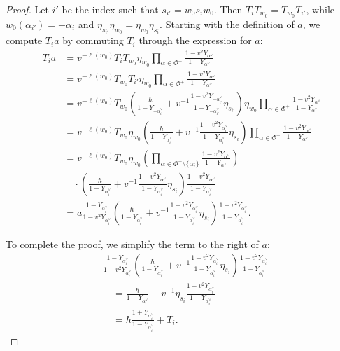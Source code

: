 \documentclass{amsart}
\theoremstyle{definition}
\numberwithin{equation}{section}
\begin{document}
\begin{proof}
    Let $i'$ be the index such that $s_{i'}=w_0s_iw_0$. Then
    $T_iT_{w_0}=T_{w_0}T_{i'}$, while
    $w_0(\alpha_{i'})=-\alpha_i$ and
    $\eta_{s_{i'}}\eta_{w_0}=\eta_{w_0}\eta_{s_i}$.
    Starting with the definition of $a$, we compute $T_i a$ by commuting $T_i$ through the expression for $a$:
\begin{align*}
    T_i a &= v^{-\ell(w_0)} T_i T_{w_0} \eta_{w_0} \prod_{\alpha \in \Phi^+} \frac{1 - v^2 Y_{\alpha^\vee}}{1 - Y_{\alpha^\vee}} \\
    &= v^{-\ell(w_0)} T_{w_0} T_{i'} \eta_{w_0} \prod_{\alpha \in \Phi^+} \frac{1 - v^2 Y_{\alpha^\vee}}{1 - Y_{\alpha^\vee}} \\
    &= v^{-\ell(w_0)} T_{w_0} \left( \frac{\hbar}{1 - Y_{-\alpha_{i'}^\vee}} + v^{-1} \frac{1 - v^2 Y_{-\alpha_{i'}^\vee}}{1 - Y_{-\alpha_{i'}^\vee}} \eta_{s_{i'}} \right) \eta_{w_0} \prod_{\alpha \in \Phi^+} \frac{1 - v^2 Y_{\alpha^\vee}}{1 - Y_{\alpha^\vee}} \\
    &= v^{-\ell(w_0)} T_{w_0} \eta_{w_0} \left( \frac{\hbar}{1 - Y_{\alpha_i^\vee}} + v^{-1} \frac{1 - v^2 Y_{\alpha_i^\vee}}{1 - Y_{\alpha_i^\vee}} \eta_{s_i} \right) \prod_{\alpha \in \Phi^+} \frac{1 - v^2 Y_{\alpha^\vee}}{1 - Y_{\alpha^\vee}} \\
    &= v^{-\ell(w_0)} T_{w_0} \eta_{w_0} \left( \prod_{\alpha \in \Phi^+ \setminus \{\alpha_i\}} \frac{1 - v^2 Y_{\alpha^\vee}}{1 - Y_{\alpha^\vee}} \right) \\
    & \quad \cdot \left( \frac{\hbar}{1 - Y_{\alpha_i^\vee}} + v^{-1} \frac{1 - v^2 Y_{\alpha_i^\vee}}{1 - Y_{\alpha_i^\vee}} \eta_{s_i} \right) \frac{1 - v^2 Y_{\alpha_i^\vee}}{1 - Y_{\alpha_i^\vee}} \\
    &= a \frac{1 - Y_{\alpha_i^\vee}}{1 - v^2 Y_{\alpha_i^\vee}} \left( \frac{\hbar}{1 - Y_{\alpha_i^\vee}} + v^{-1} \frac{1 - v^2 Y_{\alpha_i^\vee}}{1 - Y_{\alpha_i^\vee}} \eta_{s_i} \right) \frac{1 - v^2 Y_{\alpha_i^\vee}}{1 - Y_{\alpha_i^\vee}}.
\end{align*}

To complete the proof, we simplify the term to the right of $a$:
\begin{align*}
    &\frac{1 - Y_{\alpha_i^\vee}}{1 - v^2 Y_{\alpha_i^\vee}} \left( \frac{\hbar}{1 - Y_{\alpha_i^\vee}} + v^{-1} \frac{1 - v^2 Y_{\alpha_i^\vee}}{1 - Y_{\alpha_i^\vee}} \eta_{s_i} \right) \frac{1 - v^2 Y_{\alpha_i^\vee}}{1 - Y_{\alpha_i^\vee}} \\
    &\quad = \frac{\hbar}{1 - Y_{\alpha_i^\vee}} + v^{-1} \eta_{s_i} \frac{1 - v^2 Y_{\alpha_i^\vee}}{1 - Y_{\alpha_i^\vee}} \\
    &\quad = \hbar \frac{1 + Y_{\alpha_i^\vee}}{1 - Y_{\alpha_i^\vee}} + T_i.
\end{align*}
\end{proof}
\end{document}
